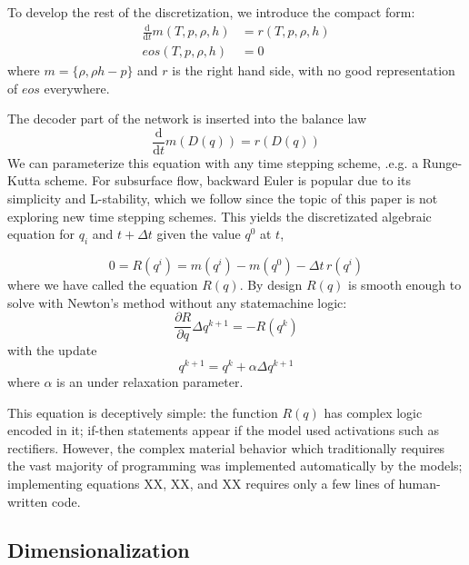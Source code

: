 \documentclass[]{article}
\begin{document}
To develop the rest of the discretization, we introduce the compact form:
\begin{align}
\frac{\mathrm{d}}{\mathrm{d}t} m(T,p,\rho,h) &= r(T,p,\rho,h)\\
eos(T,p,\rho,h) &= 0
\end{align}
where $m=\{\rho,\rho h -p\}$ and $r$ is the right hand side, with no good representation of \(eos\) everywhere.


The decoder part of the network is inserted into the balance law
\begin{equation}
\frac{\mathrm{d}}{\mathrm{d}t} m(D(q)) = r(D(q))
\end{equation}
We can parameterize this equation with any time stepping scheme, .e.g. a
Runge-Kutta scheme. For subsurface flow, backward Euler is popular due
to its simplicity and L-stability, which we follow since the topic of
this paper is not exploring new time stepping schemes. This yields the
discretizated algebraic equation for \(q_i\) and \(t+\Delta t\) given the
value \(q^0\) at \(t\),

\begin{equation}
0 = R(q^i) = m(q^{i}) - m(q^{0}) - \Delta t \, r(q^i)
\end{equation}
where we have called the equation \(R(q)\). By design \(R(q)\) is smooth
enough to solve with Newton's method without any statemachine logic:
\begin{equation}
\frac{\partial R}{\partial q} \Delta q^{k+1} = - R(q^k)
\end{equation}
with the update
\begin{equation}
q^{k+1} = q^k + \alpha\Delta q^{k+1}
\end{equation}
where $\alpha$ is an under relaxation parameter.

This equation is deceptively simple: the function $R(q)$ has complex logic encoded in it; if-then
statements appear if the model used activations such as rectifiers.
However, the complex material behavior which traditionally requires
the vast majority of programming was implemented automatically by the
models; implementing equations XX, XX, and XX requires only a few lines
of human-written code. 

\subsection{Dimensionalization}
\end{document}
